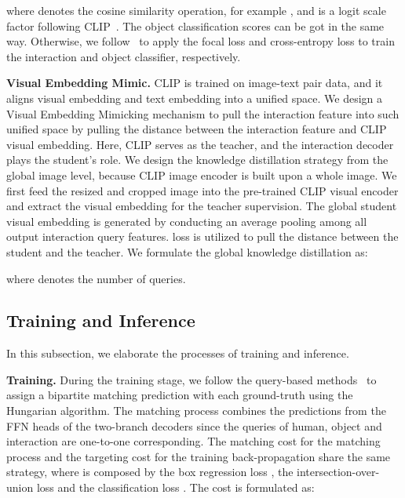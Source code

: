 \documentclass[10pt,twocolumn,letterpaper]{article}
\begin{document}
where  denotes the cosine similarity operation, for example , and  is a logit scale factor following CLIP~\cite{radford2021learning}. The object classification scores can be got in the same way. Otherwise, we follow~\cite{tamura2021qpic} to apply the focal loss and cross-entropy loss to train the interaction and object classifier, respectively.

\vspace{1mm}\noindent\textbf{Visual Embedding Mimic.}
 CLIP is trained on image-text pair data, and it aligns visual embedding and text embedding into a unified space. We design a Visual Embedding Mimicking mechanism to pull the interaction feature into such unified space by pulling the distance between the interaction feature and CLIP visual embedding. 
Here, CLIP serves as the teacher, and the interaction decoder plays the student's role. We design the knowledge distillation strategy from the global image level, because CLIP image encoder is built upon a whole image. We first feed the resized and cropped image into the pre-trained CLIP visual encoder and extract the visual embedding  for the teacher supervision. The global student visual embedding is generated by conducting an average pooling among all output interaction query features.  loss is utilized to pull the distance between the student and the teacher. We formulate the global knowledge distillation as:

where  denotes the number of queries.

\vspace{-1mm}\subsection{Training and Inference} \label{sec:train}\vspace{-1mm}
In this subsection, we elaborate the processes of training and inference.

\vspace{1mm}\noindent\textbf{Training.} During the training stage, we follow the query-based methods~\cite{carion2020endtoend,zou2021_hoitrans,tamura2021qpic} to assign a bipartite matching prediction with each ground-truth using the Hungarian algorithm. The matching process combines the predictions from the FFN heads of the two-branch decoders since the queries of human, object and interaction are one-to-one corresponding. The matching cost for the matching process and the targeting cost for the training back-propagation share the same strategy, where is composed by the box regression loss , the intersection-over-union loss  and the classification loss . The cost is formulated as:
\end{document}
